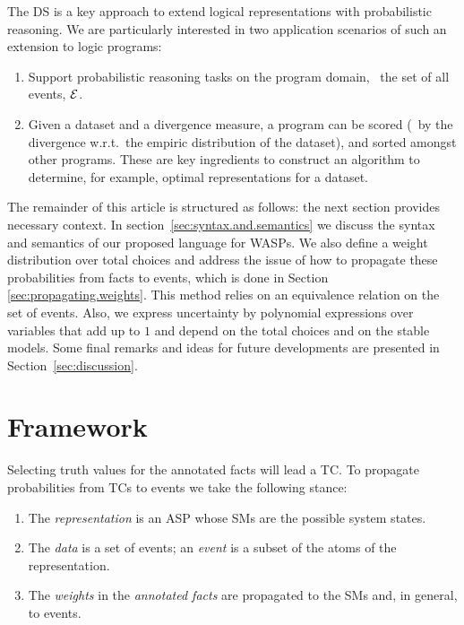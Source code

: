 \documentclass[x11names]{tlp}
\renewcommand{\cite}{\citep}
\begin{document}
The \ac{DS} \cite{sato1995statistical,riguzzi2022foundations} is a key approach to extend logical representations with probabilistic reasoning.
We are particularly interested in two application scenarios of such an extension to logic programs:
\begin{enumerate}

	\item Support probabilistic reasoning tasks on the program domain,  \ie\ the set of all events, $\EVENTSset$.

	\item Given a dataset and a divergence measure, a program can be scored (\eg\ by the divergence w.r.t.~the empiric distribution of the dataset), and sorted amongst other programs.
	These are key ingredients to construct an algorithm to determine, for example, optimal representations for a dataset.

\end{enumerate}

\noindent The remainder of this article is structured as follows: the next section provides necessary context.
In section~\ref{sec:syntax.and.semantics} we discuss the syntax and semantics of our proposed language for \acfp{WASP}.
We also define a weight distribution over total choices and address the issue of how to propagate these probabilities from facts to events, which is done in Section \ref{sec:propagating.weights}.
This method relies on an equivalence relation on the set of events.
Also, we express uncertainty by polynomial expressions over variables that add up to $1$ and depend on the total choices and on the stable models.
Some final remarks and ideas for future developments are presented in Section~\ref{sec:discussion}.

\section{Framework}
\label{sec:framework}

Selecting truth values for the annotated facts will lead a \acf{TC}.
To propagate probabilities from \aclp{TC} to events we take the following stance: %

\begin{enumerate}\tight
    \item The \emph{representation} is an \acl{ASP} whose \aclp{SM} are the possible system states.\label{assumption:smodels.equal.systemstates}
    \item The \emph{data} is a set of events; an \emph{event} is a subset of the atoms of the representation.\label{assumption:data.literals}
    \item The \emph{weights} in the \emph{annotated facts} are propagated to the \aclp{SM} and, in general, to events.\label{assumption:weights.propagation}
\end{enumerate} 
\end{document}
